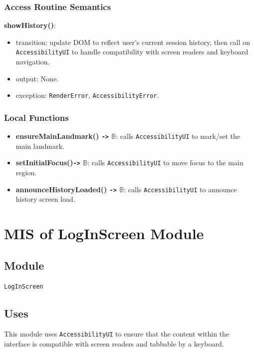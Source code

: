 \documentclass[12pt, titlepage]{article}
\newcommand{\Bool}{\ensuremath{\mathbb{B}}}
\begin{document}
\subsubsection{Access Routine Semantics}

\noindent \textbf{showHistory()}:
\begin{itemize}
  \item transition: update DOM to reflect user's current session
    history, then call on \texttt{AccessibilityUI} to
    handle compatibility with screen readers and keyboard navigation.
  \item output: None.
  \item exception: \texttt{RenderError}, \texttt{AccessibilityError}.
\end{itemize}

\subsubsection{Local Functions}

\begin{itemize}
  \item \textbf{ensureMainLandmark()  \texttt{->} \Bool}: calls
    \texttt{AccessibilityUI}
    to mark/set the main landmark.
  \item \textbf{setInitialFocus()\texttt{->} \Bool}: calls
    \texttt{AccessibilityUI}
    to move focus to the main region.
  \item \textbf{announceHistoryLoaded() \texttt{->} \Bool}: calls
    \texttt{AccessibilityUI}
    to announce history screen load.
\end{itemize}

\section{MIS of LogInScreen Module}\label{LogInScreen}

\subsection{Module}

\texttt{LogInScreen}

\subsection{Uses}

This module uses \texttt{AccessibilityUI} to ensure that the content
within the interface is
compatible with screen readers and tabbable by a keyboard.
\end{document}

